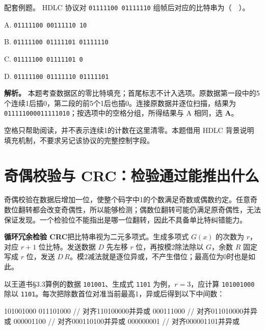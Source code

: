 {\begin{example}[配套例题]

配套例题。 HDLC 协议对 \texttt{01111100 01111110} 组帧后对应的比特串为（　）。

A. \texttt{01111100 00111110 10}

B. \texttt{01111100 01111101 01111110}

C. \texttt{01111100 01111101 0}

D. \texttt{01111100 01111110 01111101}

\end{example}}

\textbf{解析。} 本题考查数据区的零比特填充；首尾标志不计入选项。原数据第一段中的5个连续1后插0，第二段的前5个1后也插0。连接原数据并逐位扫描，结果为 \texttt{011111000011111010}；按选项中的空格分组，所得结果与 A 相同，选 \textbf{A}。

空格只帮助阅读，并不表示连续1的计数在这里清零。本题借用 HDLC 背景说明填充机制，不要求另记该协议的完整控制字段。

\section{奇偶校验与 CRC：检验通过能推出什么}\label{CN03-03}

奇偶校验在数据后增加一位，使整个码字中1的个数满足奇数或偶数约定。任意奇数位翻转都会改变奇偶性，所以能够检测；偶数位翻转可能仍满足原奇偶性，无法保证发现。一个检验位不能指出是哪一位翻转，因此不具备单比特纠错能力。

\textbf{循环冗余检验 CRC}把比特串视为二元多项式。生成多项式 \(G(x)\) 的次数为 \(r\)，对应 \(r+1\) 位比特。发送数据 \(D\) 先左移 \(r\) 位，再按模2除法除以 \(G\)，余数 \(R\) 固定写成 \(r\) 位，发送 \(D\,R\)。模2减法就是逐位异或，不产生借位；最高位为0时也是如此。

以王道书§3.3算例的数据 \texttt{101001}、生成式 \texttt{1101} 为例，\(r=3\)，应计算 \texttt{101001000} 除以 \texttt{1101}。每次把除数首位对准当前最高1，异或后得到以下中间数：

\par\medskip\noindent\begin{minipage}{\linewidth}
\begin{codeblock}[language={}]
101001000
011101000  // 对齐110100000并异或
000111000  // 对齐011010000并异或
000001100  // 对齐000110100并异或
000000001  // 对齐000001101并异或
\end{codeblock}
\end{minipage}\par\medskip

